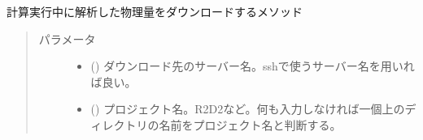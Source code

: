 \documentclass[letterpaper,10pt,dvipdfmx,report]{sphinxmanual}
\begin{document}
\begin{fulllineitems}
\label{\detokenize{io:R2D2.R2D2_data.sync_vc}}
計算実行中に解析した物理量をダウンロードするメソッド
\begin{quote}\begin{description}
\item[{パラメータ}] \leavevmode\begin{itemize}
\item {} 
 () \sphinxhyphen{}\sphinxhyphen{} ダウンロード先のサーバー名。sshで使うサーバー名を用いれば良い。

\item {} 
 () \sphinxhyphen{}\sphinxhyphen{} プロジェクト名。\textquotesingle{}R2D2\textquotesingle{}など。何も入力しなければ一個上のディレクトリの名前をプロジェクト名と判断する。

\end{itemize}

\end{description}\end{quote}

\end{fulllineitems}

\end{document}
